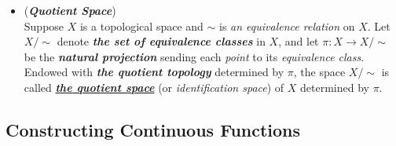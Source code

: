 \documentclass[11pt]{article}
\begin{document}
\begin{itemize}
\item \begin{definition}(\emph{\textbf{Quotient Space}})\\
Suppose $X$ is a topological space and $\sim$ is \emph{an equivalence relation} on $X$. Let $X/\sim$ denote \emph{\textbf{the set of equivalence classes}} in $X$, and let $\pi: X \rightarrow X/\sim$ be the \emph{\textbf{natural projection}} sending each \emph{point} to its \emph{equivalence class}. Endowed with \emph{\textbf{the quotient topology}} determined by $\pi$, the space $X/\sim$ is called \underline{\emph{\textbf{the quotient space}}} (or \emph{identification space}) of $X$ determined by $\pi$.
\end{definition}
\end{itemize}

\subsection{Constructing Continuous Functions}
\end{document}
